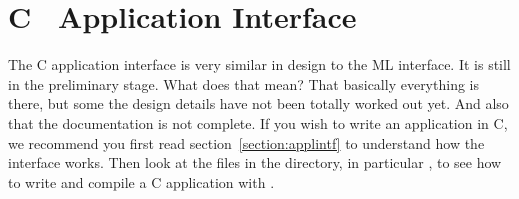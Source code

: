 %
%
%
\section{C \ensemble\ Application Interface}

The C application interface is very similar in design to the ML interface.  It is
still in the preliminary stage.  What does that mean?  That basically everything is
there, but some the design details have not been totally worked out yet.  And also
that the documentation is not complete.  If you wish to write an application in C, we
recommend you first read section~\ref{section:applintf} to understand how the
interface works.  Then look at the files in the \sourcecappl{} directory, in
particular , to see how to write and compile a C application
with \ensemble.

